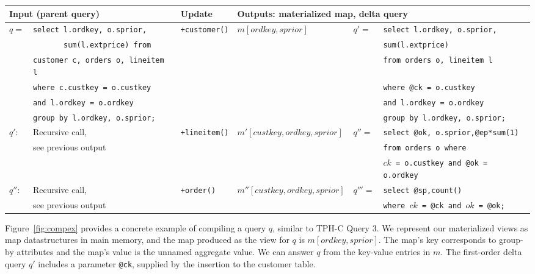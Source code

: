 \def \sql#1{{\scriptsize {\tt #1}}}
\begin{figure*}[htbp]
\begin{tabular}{ll|l|l|ll}
\multicolumn{2}{l}{Input (parent query)}
& Update 
& \multicolumn{3}{l}{Outputs: materialized map, delta query}
\\
\hline
$q =$
& \sql{select l.ordkey, o.sprior,}
& \texttt{+customer()}
& $m[ordkey,sprior]$
& $q' =$
& \sql{select l.ordkey, o.sprior,}
\\
& \sql{\ \ \ \ \ \ \ sum(l.extprice) from}
& & & & \sql{sum(l.extprice)}
\\
& \sql{customer c, orders o, lineitem l}
& & & & \sql{from orders o, lineitem l}
\\
& \sql{where c.custkey = o.custkey}
& & & & \sql{where @ck = o.custkey} 
\\
& \sql{and l.ordkey = o.ordkey}
& & & & \sql{and l.ordkey = o.ordkey}
\\
& \sql{group by l.ordkey, o.sprior;}
& & & & \sql{group by l.ordkey, o.sprior;}
\\
\hline
$q'$:
& Recursive call,
& \texttt{+lineitem()} 
& $m'[custkey,ordkey,sprior]$
& $q'' =$ & \sql{select @ok, o.sprior,@ep*sum(1)}
\\
& see previous output
& & & & \sql{from orders o where}
\\
& & & & & \sql{$ck$ = o.custkey and @ok = o.ordkey}
\\
\hline
$q''$:
& Recursive call,
& \texttt{+order()} 
& $m''[custkey,ordkey,sprior]$
& $q'''=$ & \sql{select @sp,count()}
\\
& see previous output
& & & & \sql{where $ck$ = @ck and $ok$ = @ok;}
\end{tabular}
\caption{Recursive query compilation in DBToaster. For query $q$, we produce a
sequence of materializations and delta queries for maintenance: $\tuple{m,q'},
\tuple{m',q''}, \tuple{m'',q'''}$. This is a partial compilation trace, our
algorithm considers all permutations of updates.}
\label{fig:compex}
\end{figure*}


Figure~\ref{fig:compex} provides a concrete example of compiling a query $q$,
similar to TPH-C Query 3. We represent our materialized views as map
datastructures in main memory, and the map produced as the view for $q$ is
$m[ordkey,sprior]$. The map's key corresponds to group-by attributes and the
map's value is the unnamed aggregate value. We can answer $q$ from the
key-value entries in $m$. The first-order delta query $q'$ includes a parameter
{\tt @ck}, supplied by the insertion to the customer table.

